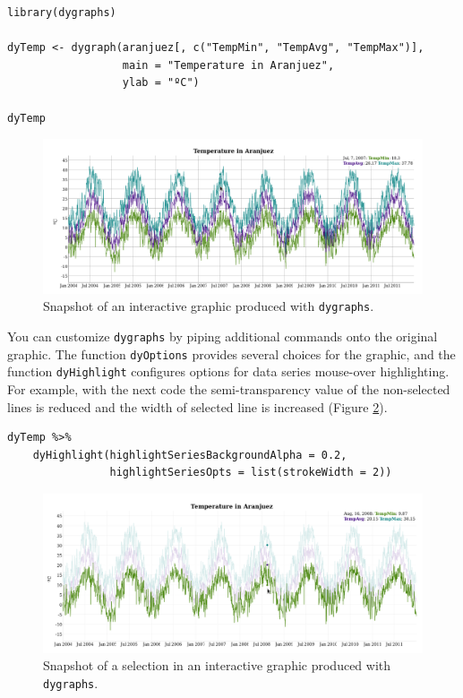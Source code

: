 
\lstset{language=r,label= ,caption= ,captionpos=b,numbers=none}
\begin{lstlisting}
library(dygraphs)

dyTemp <- dygraph(aranjuez[, c("TempMin", "TempAvg", "TempMax")],
                  main = "Temperature in Aranjuez",
                  ylab = "ºC")

dyTemp
\end{lstlisting}

\begin{figure}[htbp]
\centering
\includegraphics[width=.9\linewidth]{figs/dygraphs_aranjuez.png}
\caption{Snapshot of an interactive graphic produced with \texttt{dygraphs}. \label{fig:dygraphs}}
\end{figure}



You can customize \texttt{dygraphs} by piping additional commands onto the original graphic.  The function \texttt{dyOptions} provides several choices for the graphic, and the function \texttt{dyHighlight} configures options for data series mouse-over highlighting. For example, with the next code the semi-transparency value of the non-selected lines is reduced and the width of selected line is increased (Figure \ref{fig:dygraphs_selected}).

\lstset{language=r,label= ,caption= ,captionpos=b,numbers=none}
\begin{lstlisting}
dyTemp %>%
    dyHighlight(highlightSeriesBackgroundAlpha = 0.2,
                highlightSeriesOpts = list(strokeWidth = 2))
\end{lstlisting}

\begin{figure}[htbp]
\centering
\includegraphics[width=.9\linewidth]{figs/dygraphs_aranjuez_selected.png}
\caption{Snapshot of a selection in an interactive graphic produced with \texttt{dygraphs}. \label{fig:dygraphs_selected}}
\end{figure}

